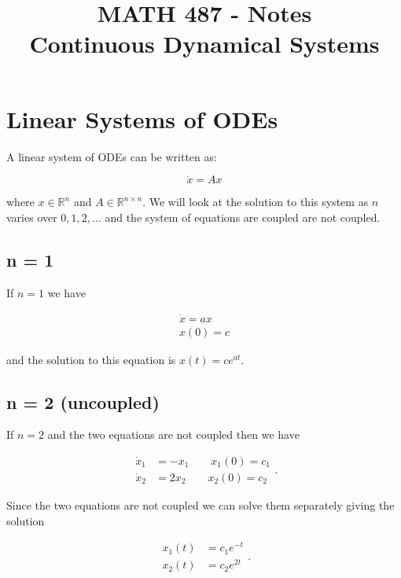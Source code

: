 \documentclass[12pt]{article}
\title{MATH 487 - Notes \\
Continuous Dynamical Systems}
\theoremstyle{definition}
\begin{document}
\maketitle
\tableofcontents

\section{Linear Systems of ODEs}

A linear system of ODEs can be written as:

\begin{equation*}
\dot x = Ax
\end{equation*}

where $x \in \mathbb{R}^n$ and $A \in \mathbb{R}^{n \times n}$. We will look at the solution to this system as $n$ varies over $0, 1, 2, \ldots$ and the system of equations are coupled are not coupled.

\subsection{n = 1}

If $n = 1$ we have

\begin{equation*}
\begin{split}
\dot x = ax \\
x(0) = c
\end{split}
\end{equation*}

and the solution to this equation is $x(t) = c e^{at}$.

\subsection{n = 2 (uncoupled)}

If $n = 2$ and the two equations are not coupled then we have

\begin{equation*}
\begin{split}
\dot x_{1} &= -x_{1} \quad\quad x_1(0) = c_1 \\
\dot x_{2} &= 2x_2 \quad\quad x_2(0) = c_2
\end{split}
.
\end{equation*}

Since the two equations are not coupled we can solve them separately giving the solution

\begin{equation*}
\begin{split}
x_1(t) &= c_1 e^{-t} \\
x_2(t) &= c_2 e^{2t}
\end{split}
.
\end{equation*}
\end{document}
